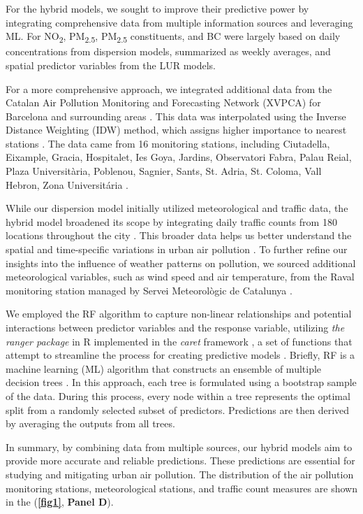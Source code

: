 \documentclass{article}
\begin{document}
For the hybrid models, we sought to improve their predictive power by integrating comprehensive data from multiple information sources and leveraging ML. For NO\textsubscript{2}, PM\textsubscript{2.5}, PM\textsubscript{2.5} constituents, and BC were largely based on daily concentrations from dispersion models, summarized as weekly averages, and spatial predictor variables from the LUR models. 

For a more comprehensive approach, we integrated additional data from the Catalan Air Pollution Monitoring and Forecasting Network (XVPCA) for Barcelona and surrounding areas \cite{xarxa2012}. This data was interpolated using the Inverse Distance Weighting (IDW) method, which assigns higher importance to nearest stations \cite{hoek2017methods}. The data came from 16 monitoring stations, including Ciutadella, Eixample, Gracia, Hospitalet, Ies Goya, Jardins, Observatori Fabra, Palau Reial, Plaza Universitària, Poblenou, Sagnier, Sants, St. Adria, St. Coloma, Vall Hebron, Zona Universitária \cite{xarxa2012}.

While our dispersion model initially utilized meteorological and traffic data, the hybrid model broadened its scope by integrating daily traffic counts from 180 locations throughout the city \cite{trafficbcn}. This broader data helps us better understand the spatial and time-specific variations in urban air pollution \cite{pinto2020}. To further refine our insights into the influence of weather patterns on pollution, we sourced additional meteorological variables, such as wind speed and air temperature, from the Raval monitoring station managed by Servei Meteorològic de Catalunya \cite{xema2013}.

We employed the RF algorithm to capture non-linear relationships and potential interactions between predictor variables and the response variable, utilizing \textit{the ranger package} in R implemented in the \textit{caret} framework \cite{wright2019}, a set of functions that attempt to streamline the process for creating predictive models \cite{caret2008}. Briefly, RF is a machine learning (ML) algorithm that constructs an ensemble of multiple decision trees \cite{breiman2001}. In this approach, each tree is formulated using a bootstrap sample of the data. During this process, every node within a tree represents the optimal split from a randomly selected subset of predictors. Predictions are then derived by averaging the outputs from all trees.

In summary, by combining data from multiple sources, our hybrid models aim to provide more accurate and reliable predictions. These predictions are essential for studying and mitigating urban air pollution. The distribution of the air pollution monitoring stations, meteorological stations, and traffic count measures are shown in the (\textbf{\cref{fig1}}, \textbf{Panel D}). 
\end{document}
